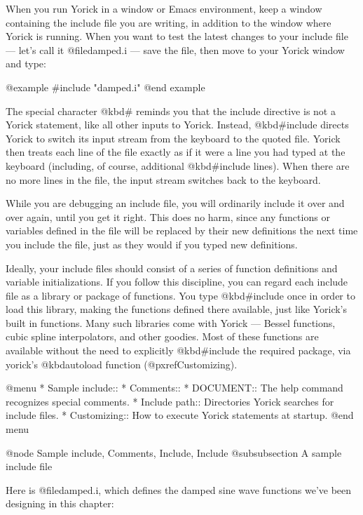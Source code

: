{When you run Yorick in a window or Emacs environment, keep a window
containing the include file you are writing, in addition to the window
where Yorick is running.  When you want to test the latest changes to
your include file --- let's call it @file{damped.i} --- save the file,
then move to your Yorick window and type:

@example
#include "damped.i"
@end example

The special character @kbd{#} reminds you that the include directive
is not a Yorick statement, like all other inputs to Yorick.  Instead,
@kbd{#include} directs Yorick to switch its input stream from the
keyboard to the quoted file.  Yorick then treats each line of the file
exactly as if it were a line you had typed at the keyboard (including,
of course, additional @kbd{#include} lines).  When there are no more
lines in the file, the input stream switches back to the keyboard.

While you are debugging an include file, you will ordinarily include
it over and over again, until you get it right.  This does no harm,
since any functions or variables defined in the file will be replaced
by their new definitions the next time you include the file, just as
they would if you typed new definitions.

Ideally, your include files should consist of a series of function
definitions and variable initializations.  If you follow this
discipline, you can regard each include file as a library or package of
functions.  You type @kbd{#include} once in order to load this
library, making the functions defined there available, just like
Yorick's built in functions.  Many such libraries come with Yorick ---
Bessel functions, cubic spline interpolators, and other goodies.
Most of these functions are available without the need to explicitly
@kbd{#include} the required package, via yorick's @kbd{autoload}
function (@pxref{Customizing}).

@menu
* Sample include::              
* Comments::                    
* DOCUMENT::                    The help command recognizes special comments.
* Include path::                Directories Yorick searches for include files.
* Customizing::                 How to execute Yorick statements at startup.
@end menu

@node Sample include, Comments, Include, Include
@subsubsection A sample include file

Here is @file{damped.i}, which defines the damped sine wave functions
we've been designing in this chapter:

}
